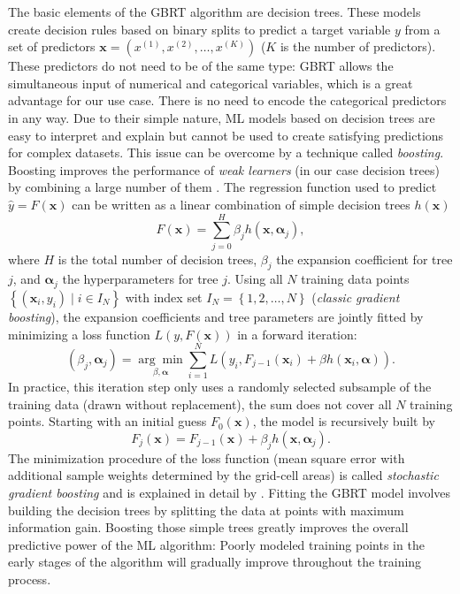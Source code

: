 The basic elements of the \ac{GBRT} algorithm are decision trees. These models
create decision rules based on binary splits to predict a target variable $y$
from a set of predictors $\bm{x} = \left( x^{(1)}, x^{(2)}, \ldots, x^{(K)}
\right)$ ($K$ is the number of predictors). These predictors do not need to be
of the same type: \ac{GBRT} allows the simultaneous input of numerical and
categorical variables, which is a great advantage for our use case. There is no
need to encode the categorical predictors in any way. Due to their simple
nature, \acf{ML} models based on decision trees are easy to interpret and
explain but cannot be used to create satisfying predictions for complex
datasets. This issue can be overcome by a technique called \emph{boosting}.
Boosting improves the performance of \emph{weak learners} (in our case decision
trees) by combining a large number of them  \autocite{Freund1996}. The
regression function used to predict $\hat{y} = F(\bm{x})$ can be written as a
linear combination of simple decision trees $h(\bm{x})$
\begin{equation}
  F(\bm{x}) = \sum_{j=0}^{H} \beta_j h(\bm{x}, \bm{\alpha}_j),
  \label{eq:app:b:f_x_sum}
\end{equation}
where $H$ is the total number of decision trees, $\beta_j$ the expansion
coefficient for tree $j$, and $\bm{\alpha}_j$ the hyperparameters for tree $j$.
Using all $N$ training data points $\left\{ \left( \bm{x}_i, y_i \right) \mid i
\in I_N \right\}$ with index set $I_N = \left\{ 1, 2, \ldots, N \right\}$
(\emph{classic gradient boosting}), the expansion coefficients and tree
parameters are jointly fitted by minimizing a loss function $L \left( y,
F(\bm{x}) \right)$ in a forward iteration:
\begin{equation}
  \left( \beta_j, \bm{\alpha}_j \right) = \underset{\beta,
    \bm{\alpha}}{\arg\min} \sum_{i=1}^{N} L \left( y_i, F_{j-1}(\bm{x}_i) +
  \beta h(\bm{x}_i, \bm{\alpha}) \right).
  \label{eq:app:b:beta_alpha}
\end{equation}
In practice, this iteration step only uses a randomly selected subsample of the
training data (drawn without replacement), \ie{} the sum does not cover all $N$
training points. Starting with an initial guess $F_0(\bm{x})$, the model is
recursively built by
\begin{equation}
  F_j(\bm{x}) = F_{j-1}(\bm{x}) + \beta_j h(\bm{x}, \bm{\alpha}_j).
  \label{eq:app:b:f_x_recursion}
\end{equation}
The minimization procedure of the loss function (mean square error with
additional sample weights determined by the grid-cell areas) is called
\emph{stochastic gradient boosting} and is explained in detail by
\textcite{Friedman2001, Friedman2002}. Fitting the \ac{GBRT} model involves
building the decision trees by splitting the data at points with maximum
information gain. Boosting those simple trees greatly improves the overall
predictive power of the \ac{ML} algorithm: Poorly modeled training points in
the early stages of the algorithm will gradually improve throughout the
training process.

